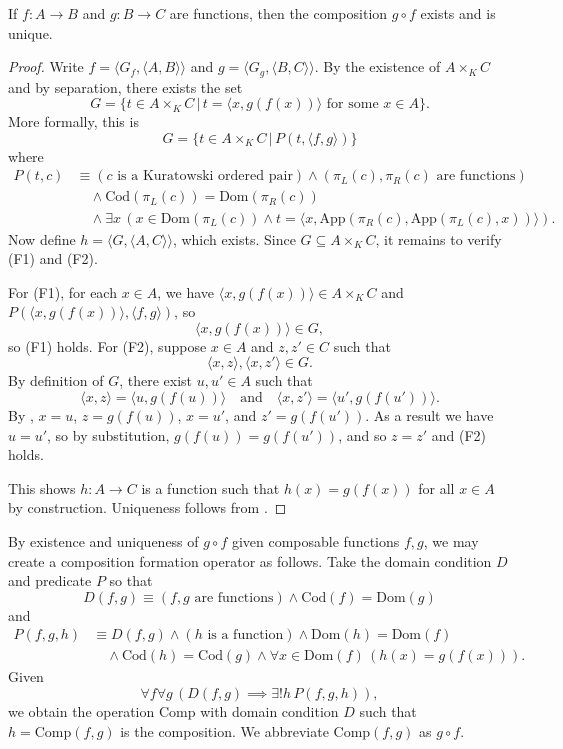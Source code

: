 \begin{prop}
	If $f:A\rightarrow B$ and $g:B\rightarrow C$ are functions, then the composition $g\circ f$ exists and is unique.
\end{prop}
\begin{proof}
	Write $f = \langle G_{f}, \langle A, B\rangle\rangle$ and $g = \langle G_{g}, \langle B, C\rangle\rangle$.
	By the existence of $A\times_{K} C$ and by separation, there exists the set
	\[ G = \{ t\in A\times_{K} C \,|\, t = \langle x, g(f(x))\rangle \text{ for some } x\in A \}. \]
	More formally, this is
	\[ G = \{ t\in A\times_{K} C \,|\, P(t, \langle f, g\rangle) \} \]
	where
	\begin{align*}
		P(t, c)&\equiv (c\text{ is a Kuratowski ordered pair})\land (\pi_{L}(c), \pi_{R}(c)\text{ are functions}) \\
		&\quad\land \textrm{Cod}(\pi_{L}(c)) = \textrm{Dom}(\pi_{R}(c)) \\
		&\quad\land \exists x\, (x\in\textrm{Dom}(\pi_{L}(c)) \land t = \langle x, \textrm{App}(\pi_{R}(c), \textrm{App}(\pi_{L}(c), x))\rangle).
	\end{align*}
	Now define $h = \langle G, \langle A, C\rangle\rangle$, which exists.
	Since $G\subseteq A\times_{K} C$, it remains to verify (F1) and (F2).
	
	For (F1), for each $x\in A$, we have $\langle x, g(f(x))\rangle\in A\times_{K} C$ and $P(\langle x, g(f(x))\rangle, \langle f, g\rangle)$, so 
	\[ \langle x, g(f(x))\rangle\in G, \] 
	so (F1) holds.
	For (F2), suppose $x\in A$ and $z, z'\in C$ such that 
	\[ \langle x, z\rangle, \langle x, z'\rangle\in G. \]
	By definition of $G$, there exist $u, u'\in A$ such that
	\[ \langle x, z\rangle = \langle u, g(f(u))\rangle \quad\text{and}\quad \langle x, z'\rangle = \langle u', g(f(u'))\rangle. \]
	By , $x = u$, $z = g(f(u))$, $x = u'$, and $z' = g(f(u'))$.
	As a result we have $u = u'$, so by substitution, $g(f(u)) = g(f(u'))$, and so $z = z'$ and (F2) holds.
	
	This shows $h:A\rightarrow C$ is a function such that $h(x) = g(f(x))$ for all $x\in A$ by construction. 
	Uniqueness follows from .
\end{proof}

By existence and uniqueness of $g\circ f$ given composable functions $f, g$, we may create a composition formation operator as follows.
Take the domain condition $D$ and predicate $P$ so that 
\[ D(f, g)\equiv (f, g\textrm{ are functions})\land \textrm{Cod}(f) = \textrm{Dom}(g) \] 
and 
\begin{align*}
	P(f, g, h)&\equiv D(f, g)\land (h\text{ is a function})\land \textrm{Dom}(h) = \textrm{Dom}(f) \\
	&\quad\land \textrm{Cod}(h) = \textrm{Cod}(g)\land \forall x\in\textrm{Dom}(f)\, (h(x) = g(f(x))). 
\end{align*}
Given 
\[ \forall f\forall g\, (D(f, g)\implies \exists ! h\, P(f, g, h)), \]
we obtain the operation $\textrm{Comp}$ with domain condition $D$ such that $h = \textrm{Comp}(f, g)$ is the composition. 
We abbreviate $\textrm{Comp}(f, g)$ as $g\circ f$. 

